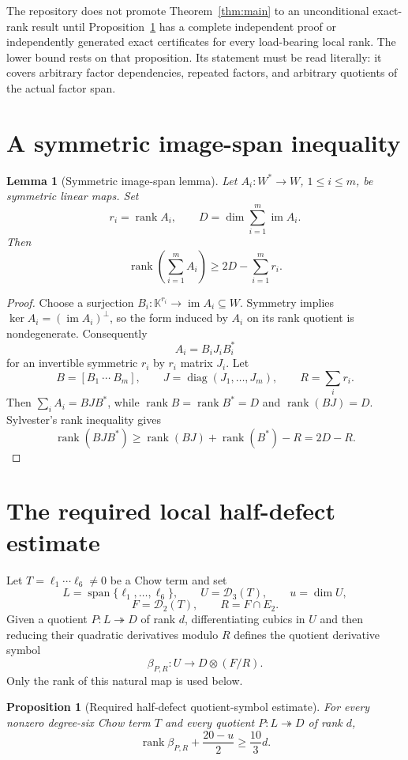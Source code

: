 \documentclass[11pt]{amsart}
\newcommand{\K}{\mathbb{K}}
\newcommand{\Span}{\operatorname{span}}
\newcommand{\im}{\operatorname{im}}
\newcommand{\rank}{\operatorname{rank}}
\newcommand{\cD}{\mathcal{D}}
\newtheorem{proposition}[theorem]{Proposition}
\newtheorem{lemma}[theorem]{Lemma}
\theoremstyle{definition}
\begin{document}
The repository does not promote Theorem~\ref{thm:main} to an unconditional
exact-rank result until Proposition~\ref{prop:half-defect} has a complete
independent proof or independently generated exact certificates for every
load-bearing local rank.  The lower bound rests on that proposition.  Its statement
must be read literally: it covers arbitrary factor dependencies, repeated
factors, and arbitrary quotients of the actual factor span.

\section{A symmetric image-span inequality}

\begin{lemma}[Symmetric image-span lemma]\label{lem:image-span}
Let \(A_i:W^*\to W\), \(1\leq i\leq m\), be symmetric linear maps.  Set
\[
 r_i=\rank A_i,
 \qquad
 D=\dim\sum_{i=1}^{m}\im A_i.
\]
Then
\[
 \rank\!\left(\sum_{i=1}^{m}A_i\right)
 \geq 2D-\sum_{i=1}^{m}r_i.
\]
\end{lemma}

\begin{proof}
Choose a surjection \(B_i:\K^{r_i}\to\im A_i\subseteq W\).  Symmetry
implies \(\ker A_i=(\im A_i)^\perp\), so the form induced by \(A_i\) on
its rank quotient is nondegenerate.  Consequently
\[
 A_i=B_iJ_iB_i^*
\]
for an invertible symmetric \(r_i\) by \(r_i\) matrix \(J_i\).  Let
\[
 B=[B_1\ \cdots\ B_m],
 \qquad J=\operatorname{diag}(J_1,\ldots,J_m),
 \qquad R=\sum_i r_i.
\]
Then \(\sum_iA_i=BJB^*\), while \(\rank B=\rank B^*=D\) and
\(\rank(BJ)=D\).  Sylvester's rank inequality gives
\[
 \rank(BJB^*)\geq\rank(BJ)+\rank(B^*)-R=2D-R.
\]
\end{proof}

\section{The required local half-defect estimate}

Let \(T=\ell_1\cdots\ell_6\neq0\) be a Chow term and set
\[
 L=\Span\{\ell_1,\ldots,\ell_6\},\qquad
 U=\cD_3(T),\qquad u=\dim U,
\]
\[
 F=\cD_2(T),\qquad R=F\cap E_2.
\]
Given a quotient \(P:L\twoheadrightarrow D\) of rank \(d\), differentiating
cubics in \(U\) and then reducing their quadratic derivatives modulo \(R\)
defines the quotient derivative symbol
\[
 \beta_{P,R}:U\longrightarrow D\otimes(F/R).
\]
Only the rank of this natural map is used below.

\begin{proposition}[Required half-defect quotient-symbol estimate]
\label{prop:half-defect}
For every nonzero degree-six Chow term \(T\) and every quotient
\(P:L\twoheadrightarrow D\) of rank \(d\),
\begin{equation}\label{eq:HD}
 \rank\beta_{P,R}+\frac{20-u}{2}\geq\frac{10}{3}d.
\end{equation}
\end{proposition}
\end{document}
